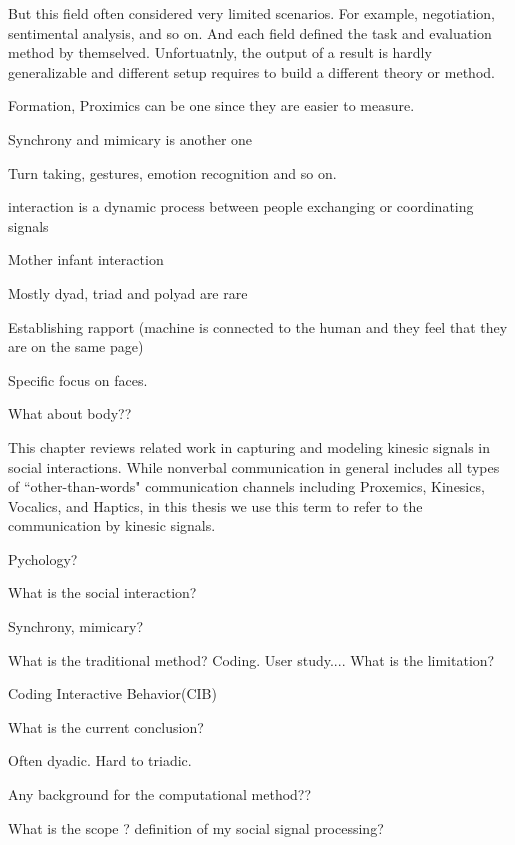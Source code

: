 But this field often considered very limited scenarios. For example, negotiation, sentimental analysis, and so on. And each field defined the task and evaluation method by themselved. Unfortuatnly, the output of a result is hardly generalizable and different setup requires to build a different theory or method. 




Formation, Proximics can be one since they are easier to measure. 


Synchrony and mimicary is another one



Turn taking, gestures, emotion recognition and so on. 	


interaction is a dynamic process between people exchanging or coordinating signals

Mother infant interaction

Mostly dyad, triad and polyad are rare

Establishing rapport (machine is connected to the human and they feel that they are on the same page)






Specific focus on faces. 



What about body??

 




This chapter reviews related work in capturing and modeling kinesic signals in social interactions. While nonverbal communication in general includes all types of ``other-than-words" communication channels including Proxemics, Kinesics, Vocalics, and Haptics, in this thesis we use this term to refer to the communication by kinesic signals. 




Pychology? 

What is the social interaction?

Synchrony, mimicary?


What is the traditional method? Coding. User study....  What is the limitation?


Coding Interactive Behavior(CIB)

What is the current conclusion? 


Often dyadic. Hard to triadic. 


Any background for the computational method??



What is the scope ? definition of my social signal processing?


